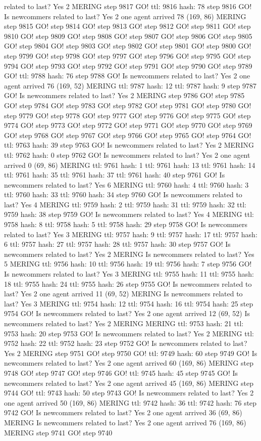related to last? Yes 2 MERING step 9817 GO! ttl: 9816 hash: 78 step 9816 GO! Is newcommers related to last? Yes 2 one agent arrived 78 (169, 86) MERING step 9815 GO! step 9814 GO! step 9813 GO! step 9812 GO! step 9811 GO! step 9810 GO! step 9809 GO! step 9808 GO! step 9807 GO! step 9806 GO! step 9805 GO! step 9804 GO! step 9803 GO! step 9802 GO! step 9801 GO! step 9800 GO! step 9799 GO! step 9798 GO! step 9797 GO! step 9796 GO! step 9795 GO! step 9794 GO! step 9793 GO! step 9792 GO! step 9791 GO! step 9790 GO! step 9789 GO! ttl: 9788 hash: 76 step 9788 GO! Is newcommers related to last? Yes 2 one agent arrived 76 (169, 52) MERING ttl: 9787 hash: 12 ttl: 9787 hash: 9 step 9787 GO! Is newcommers related to last? Yes 2 MERING step 9786 GO! step 9785 GO! step 9784 GO! step 9783 GO! step 9782 GO! step 9781 GO! step 9780 GO! step 9779 GO! step 9778 GO! step 9777 GO! step 9776 GO! step 9775 GO! step 9774 GO! step 9773 GO! step 9772 GO! step 9771 GO! step 9770 GO! step 9769 GO! step 9768 GO! step 9767 GO! step 9766 GO! step 9765 GO! step 9764 GO! ttl: 9763 hash: 39 step 9763 GO! Is newcommers related to last? Yes 2 MERING ttl: 9762 hash: 0 step 9762 GO! Is newcommers related to last? Yes 2 one agent arrived 0 (69, 86) MERING ttl: 9761 hash: 1 ttl: 9761 hash: 13 ttl: 9761 hash: 14 ttl: 9761 hash: 35 ttl: 9761 hash: 37 ttl: 9761 hash: 40 step 9761 GO! Is newcommers related to last? Yes 6 MERING ttl: 9760 hash: 4 ttl: 9760 hash: 3 ttl: 9760 hash: 33 ttl: 9760 hash: 34 step 9760 GO! Is newcommers related to last? Yes 4 MERING ttl: 9759 hash: 2 ttl: 9759 hash: 31 ttl: 9759 hash: 32 ttl: 9759 hash: 38 step 9759 GO! Is newcommers related to last? Yes 4 MERING ttl: 9758 hash: 8 ttl: 9758 hash: 5 ttl: 9758 hash: 29 step 9758 GO! Is newcommers related to last? Yes 3 MERING ttl: 9757 hash: 9 ttl: 9757 hash: 17 ttl: 9757 hash: 6 ttl: 9757 hash: 27 ttl: 9757 hash: 28 ttl: 9757 hash: 30 step 9757 GO! Is newcommers related to last? Yes 2 MERING Is newcommers related to last? Yes 5 MERING ttl: 9756 hash: 10 ttl: 9756 hash: 19 ttl: 9756 hash: 7 step 9756 GO! Is newcommers related to last? Yes 3 MERING ttl: 9755 hash: 11 ttl: 9755 hash: 18 ttl: 9755 hash: 24 ttl: 9755 hash: 26 step 9755 GO! Is newcommers related to last? Yes 2 one agent arrived 11 (69, 52) MERING Is newcommers related to last? Yes 3 MERING ttl: 9754 hash: 12 ttl: 9754 hash: 16 ttl: 9754 hash: 25 step 9754 GO! Is newcommers related to last? Yes 2 one agent arrived 12 (69, 52) Is newcommers related to last? Yes 2 MERING MERING ttl: 9753 hash: 21 ttl: 9753 hash: 20 step 9753 GO! Is newcommers related to last? Yes 2 MERING ttl: 9752 hash: 22 ttl: 9752 hash: 23 step 9752 GO! Is newcommers related to last? Yes 2 MERING step 9751 GO! step 9750 GO! ttl: 9749 hash: 60 step 9749 GO! Is newcommers related to last? Yes 2 one agent arrived 60 (169, 86) MERING step 9748 GO! step 9747 GO! step 9746 GO! ttl: 9745 hash: 45 step 9745 GO! Is newcommers related to last? Yes 2 one agent arrived 45 (169, 86) MERING step 9744 GO! ttl: 9743 hash: 50 step 9743 GO! Is newcommers related to last? Yes 2 one agent arrived 50 (169, 86) MERING ttl: 9742 hash: 36 ttl: 9742 hash: 76 step 9742 GO! Is newcommers related to last? Yes 2 one agent arrived 36 (69, 86) MERING Is newcommers related to last? Yes 2 one agent arrived 76 (169, 86) MERING step 9741 GO! step 9740 